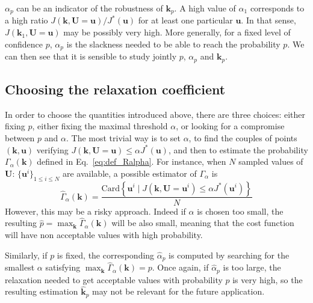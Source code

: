 \documentclass[preprint, 1p]{elsarticle}
\newcommand{\checkap}{{\alpha}_p}
\newcommand{\checka}{{\alpha}}
\newcommand{\checkk}{\mathbf{k}}
\newcommand{\checkkp}{{\mathbf{k}}_p}
\begin{document}
$\checkap$ can be an indicator of the robustness of $\checkkp$.  
A high value of $\checka_1$ corresponds to a high ratio ${J(\mathbf{k},\mathbf{U}=\mathbf{u})/J^*(\mathbf{u})}$ for at least one particular $\mathbf{u}$. In that sense, $J(\checkk_1,\mathbf{U}=\mathbf{u})$ may be possibly very high.
More generally, for a fixed level of confidence $p$, $\checkap$ is the slackness needed to be able to reach the probability $p$. %
We can then see that it is sensible to study jointly $p$, $\checkap$ and $\checkkp$.


\subsection{Choosing the relaxation coefficient}%
\label{ssec:balance}

In order to choose the quantities introduced above, there are three choices: either fixing $p$, either fixing the maximal threshold $\alpha$, or looking for a compromise between $p$ and $\alpha$.
The most trivial way is to set $\alpha$, to find the couples of points $(\mathbf{k},\mathbf{u})$ verifying $J(\mathbf{k},\mathbf{U}=\mathbf{u}) \leq \alpha J^*(\mathbf{u})$, and then to estimate the probability $\Gamma_{\alpha}(\mathbf{k})$ defined in Eq.~\eqref{eq:def_Ralpha}.
For instance, when $N$ sampled values of $\mathbf{U}$: $\{\mathbf{u}^i\}_{1\leq i \leq N}$ are available, a possible estimator of $\Gamma_{\alpha}$ is
\begin{equation}
\hat{\Gamma}_{\alpha}(\mathbf{k}) = \frac{\mathrm{Card} \left\{\mathbf{u}^i \mid J(\mathbf{k},\mathbf{U}=\mathbf{u}^i) \leq \alpha J^*(\mathbf{u}^i)\right\}}{N}
\end{equation}
However, this may be a risky approach. Indeed if $\alpha$ is chosen too small, the resulting $\hat{p}=\max_{\mathbf{k}} \hat{\Gamma}_{\alpha}(\mathbf{k})$ will be also small, meaning that the cost function will have non acceptable values with high probability.

Similarly, if $p$ is fixed, the corresponding $\hat{\checka}_p$ is computed by searching for the smallest $\alpha$ satisfying $\max_{\mathbf{k}} \hat{\Gamma}_{\alpha}(\mathbf{k})=p$. Once again, if $\hat{\checka}_p$ is too large, the relaxation needed to get acceptable values with probability $p$ is very high, so the resulting estimation $\hat{\checkk}_p$ may not be relevant for the future application.
\end{document}
